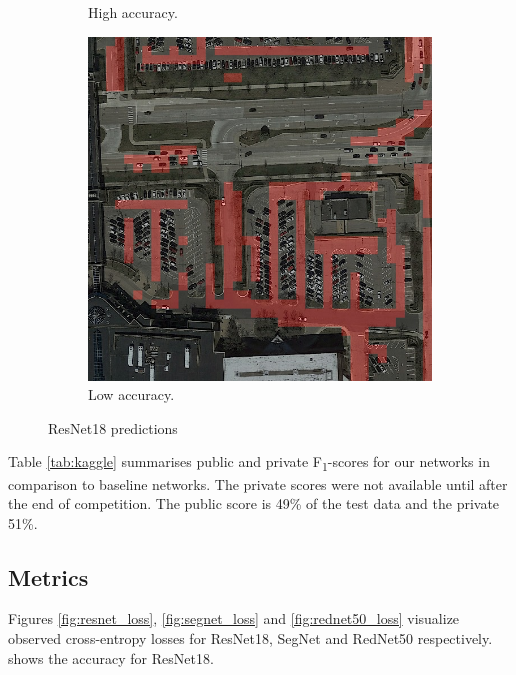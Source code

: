\documentclass[10pt,conference,compsocconf]{IEEEtran}
\begin{document}
\begin{figure}
\begin{minipage}[t!]{.195\textwidth}
\begin{subfigure}[t!]{\textwidth}
        \vspace*{-.5\baselineskip}
        \caption{\!High accuracy.\label{fig:highacc_prediction}}
        \vspace*{1.2\baselineskip}
        \includegraphics[width=\textwidth]{img/ok}
        \vspace*{-.5\baselineskip}
        \caption{Low accuracy.\label{fig:lowacc_prediction}}
    \end{subfigure}
    \caption{ResNet18 predictions}
    \label{fig:predictions}
    \end{minipage}
    \vspace*{-\baselineskip}
\end{figure}

Table \ref{tab:kaggle} summarises public and private F\textsubscript{1}-scores for our networks in comparison to baseline networks. The private scores were not available until after the end of competition. The public score is 49\% of the test data and the private 51\%.

\subsection{Metrics}
\label{subsec:metrics}
Figures \ref{fig:resnet_loss}, \ref{fig:segnet_loss} and \ref{fig:rednet50_loss} visualize observed cross-entropy losses for ResNet18, SegNet and RedNet50 respectively.  shows the accuracy for ResNet18.
\end{document}
